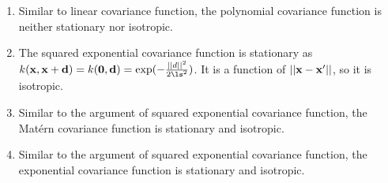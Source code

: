 \documentclass[a4paper]{article}
\begin{document}
{\begin{enumerate}
\begin{enumerate}
        \item Similar to linear covariance function, the polynomial covariance function is neither stationary nor isotropic.
        \item The squared exponential covariance function is stationary as $k(\xv, \xv + \dv) = k(\zero, \dv) = \exp(-\frac{||d||^2}{2\ls^2})$. It is a function of $||\mathbf{x} - \mathbf{x}^\prime||$, so it is isotropic.
        \item Similar to the argument of squared exponential covariance function, the Mat\'ern covariance function is stationary and isotropic.
        \item Similar to the argument of squared exponential covariance function, the exponential covariance function is stationary and isotropic.
    \end{enumerate}
\end{enumerate}
}
\end{document}
